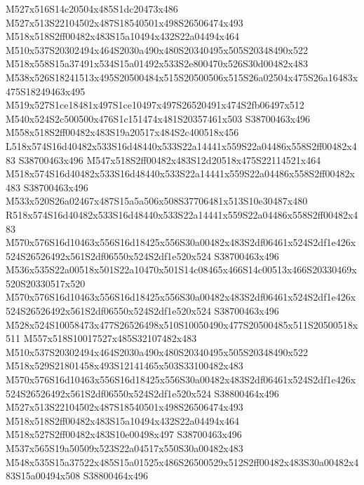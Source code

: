 \documentclass{article}
\begin{document}
\begin{multicols}{2}
M527x516S14c20504x485S1dc20473x486 M527x513S22104502x487S18540501x498S26506474x493 M518x518S2ff00482x483S15a10494x432S22a04494x464 M510x537S20302494x464S2030a490x480S20340495x505S20348490x522 M518x558S15a37491x534S15a01492x533S2e800470x526S30d00482x483 M538x526S18241513x495S20500484x515S20500506x515S26a02504x475S26a16483x475S18249463x495 M519x527S1ce18481x497S1ce10497x497S26520491x474S2fb06497x512 M540x524S2c500500x476S1c151474x481S20357461x503 S38700463x496 M558x518S2ff00482x483S19a20517x484S2c400518x456 L518x574S16d40482x533S16d48440x533S22a14441x559S22a04486x558S2ff00482x483 S38700463x496 M547x518S2ff00482x483S12d20518x475S22114521x464 M518x574S16d40482x533S16d48440x533S22a14441x559S22a04486x558S2ff00482x483 S38700463x496 M533x520S26a02467x487S15a5a506x508S37706481x513S10e30487x480 R518x574S16d40482x533S16d48440x533S22a14441x559S22a04486x558S2ff00482x483 M570x576S16d10463x556S16d18425x556S30a00482x483S2df06461x524S2df1e426x524S26526492x561S2df06550x524S2df1e520x524 S38700463x496 M536x535S22a00518x501S22a10470x501S14c08465x466S14c00513x466S20330469x520S20330517x520 M570x576S16d10463x556S16d18425x556S30a00482x483S2df06461x524S2df1e426x524S26526492x561S2df06550x524S2df1e520x524 S38700463x496 M528x524S10058473x477S26526498x510S10050490x477S20500485x511S20500518x511 M557x518S10017527x485S32107482x483 M510x537S20302494x464S2030a490x480S20340495x505S20348490x522 M518x529S21801458x493S12141465x503S33100482x483 M570x576S16d10463x556S16d18425x556S30a00482x483S2df06461x524S2df1e426x524S26526492x561S2df06550x524S2df1e520x524 S38800464x496 M527x513S22104502x487S18540501x498S26506474x493 M518x518S2ff00482x483S15a10494x432S22a04494x464 M518x527S2ff00482x483S10e00498x497 S38700463x496 M537x565S19a50509x523S22a04517x550S30a00482x483 M548x535S15a37522x485S15a01525x486S26500529x512S2ff00482x483S30a00482x483S15a00494x508 S38800464x496


\end{multicols}
\end{document}
